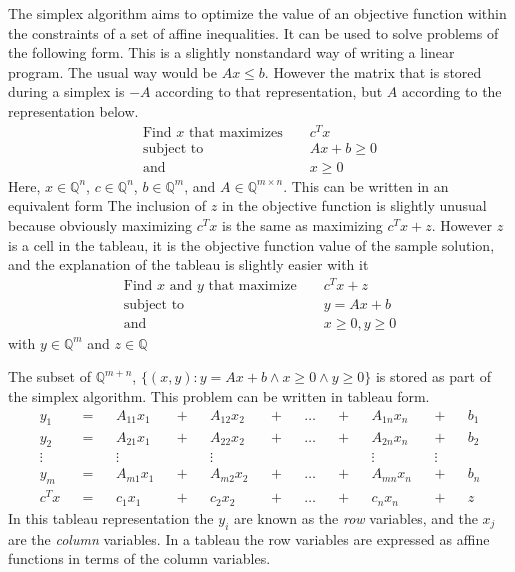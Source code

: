 \documentclass[11pt]{article} %
\begin{document}
The simplex algorithm aims to optimize the value of an objective function within the constraints of a set of affine inequalities. It can be used to solve problems of the following form.
\color{red} This is a slightly nonstandard way of writing a linear program. The usual way would be $Ax \le b$. However the matrix that is stored during a simplex is $-A$ according to that representation, but $A$ according to the representation below.\color{black}
\begin{equation}
  \begin{aligned}
    \text{Find } x \text{ that maximizes } && c^Tx \\
    \text{subject to } && A x + b \ge 0\\
    \text{and } && x \ge 0
  \end{aligned}
\end{equation}
Here, $x \in \mathbb{Q}^n$, $c \in \mathbb{Q}^n$, $b \in \mathbb{Q}^m$, and $A \in \mathbb{Q}^{m \times n}$.
This can be written in an equivalent form \color{red} The inclusion of $z$ in the objective function is slightly unusual because obviously maximizing $c^Tx$ is the same as maximizing $c^Tx + z$. However $z$ is a cell in the tableau, it is the objective function value of the sample solution, and the explanation of the tableau is slightly easier with it\color{black}
\begin{equation}
  \begin{aligned}
    \text{Find } x \text{ and } y \text{ that maximize } && c^Tx + z \\
    \text{subject to } && y = A x + b \\
    \text{and } && x \ge 0, y \ge 0
  \end{aligned}
\end{equation}
with $y \in \mathbb{Q}^m$ and $z \in \mathbb{Q}$

The subset of $\mathbb{Q}^{m+n}$, $\{(x,y) : y = Ax + b \wedge x \ge 0 \wedge y \ge 0\}$ is stored as part of the simplex algorithm. This problem can be written in tableau form.
\begin{equation}
  \begin{aligned}
    y_1 && = && A_{11}x_1 && + && A_{12}x_2 && + && \dots && + && A_{1n}x_n && + && b_1\\
    y_2 && = && A_{21}x_1 && + && A_{22}x_2 && + && \dots && + && A_{2n}x_n && + && b_2\\
    \vdots && && \vdots && && \vdots && && && && \vdots && \vdots \\
    y_m && = && A_{m1}x_1 && + && A_{m2}x_2 && + && \dots && + && A_{mn}x_n && + && b_n\\
    c^Tx && = && c_1x_1 && + && c_2x_2 && + && \dots && + && c_nx_n && + && z
  \end{aligned}
\end{equation}
In this tableau representation the $y_i$ are known as the \textit{row} variables, and the $x_j$ are the \textit{column} variables. In a tableau the row variables are expressed as affine functions in terms of the column variables.
\end{document}
